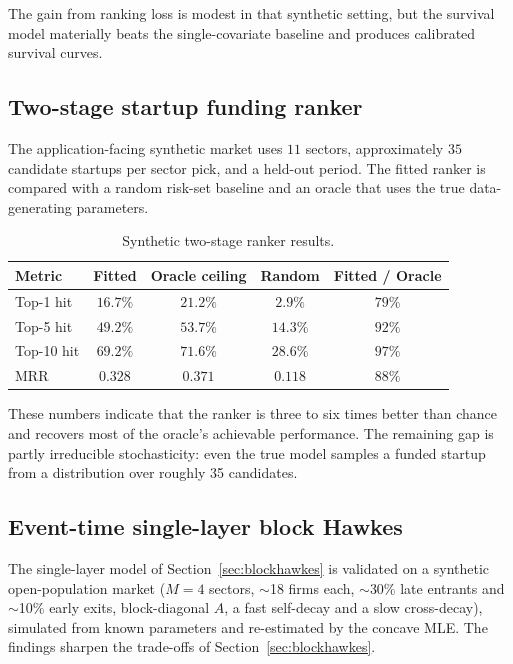 \documentclass[11pt]{article}
\theoremstyle{plain}
\theoremstyle{definition}
\theoremstyle{remark}
\begin{document}
The gain from ranking loss is modest in that synthetic setting, but the survival model materially beats the single-covariate baseline and produces calibrated survival curves.

\subsection{Two-stage startup funding ranker}
The application-facing synthetic market uses $11$ sectors, approximately $35$ candidate startups per sector pick, and a held-out period. The fitted ranker is compared with a random risk-set baseline and an oracle that uses the true data-generating parameters.

\begin{table}[h]
\centering
\caption{Synthetic two-stage ranker results.}
\label{tab:twostage}
\begin{tabular}{@{}lcccc@{}}
\toprule
Metric & Fitted & Oracle ceiling & Random & Fitted / Oracle \\
\midrule
Top-1 hit & $16.7\%$ & $21.2\%$ & $2.9\%$ & $79\%$ \\
Top-5 hit & $49.2\%$ & $53.7\%$ & $14.3\%$ & $92\%$ \\
Top-10 hit & $69.2\%$ & $71.6\%$ & $28.6\%$ & $97\%$ \\
MRR & $0.328$ & $0.371$ & $0.118$ & $88\%$ \\
\bottomrule
\end{tabular}
\end{table}

These numbers indicate that the ranker is three to six times better than chance and recovers most of the oracle's achievable performance. The remaining gap is partly irreducible stochasticity: even the true model samples a funded startup from a distribution over roughly 35 candidates.

\subsection{Event-time single-layer block Hawkes}
\label{sec:bh_results}
The single-layer model of Section~\ref{sec:blockhawkes} is validated on a synthetic open-population market ($M=4$ sectors, $\sim$18 firms each, $\sim$30\% late entrants and $\sim$10\% early exits, block-diagonal $A$, a fast self-decay and a slow cross-decay), simulated from known parameters and re-estimated by the concave MLE. The findings sharpen the trade-offs of Section~\ref{sec:blockhawkes}.
\end{document}
